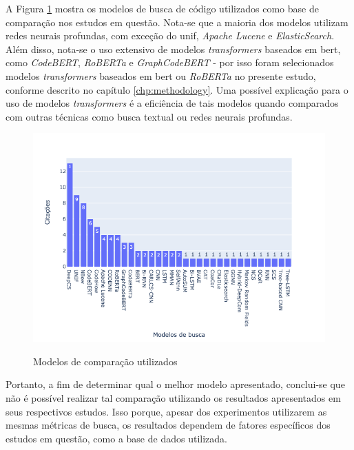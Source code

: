 A Figura \ref{fig:related-baselines} mostra os modelos de busca de código utilizados como base de comparação nos estudos em questão. Nota-se que a maioria dos modelos utilizam redes neurais profundas, com exceção do \gls{unif}, \textit{Apache Lucene} e \textit{ElasticSearch}. Além disso, nota-se o uso extensivo de modelos \textit{transformers} baseados em \gls{bert}, como \textit{CodeBERT}, \textit{RoBERTa} e \textit{GraphCodeBERT} - por isso foram selecionados modelos \textit{transformers} baseados em \gls{bert} ou \textit{RoBERTa} no presente estudo, conforme descrito no capítulo \ref{chp:methodology}. Uma possível explicação para o uso de modelos \textit{transformers} é a eficiência de tais modelos quando comparados com outras técnicas como busca textual ou redes neurais profundas.
\begin{figure}[H]
    \centering
        \caption{Modelos de comparação utilizados}
        \includegraphics[scale=0.7]{./imagens/trabalhos-relacionados/baselines.png}
        \label{fig:related-baselines}
\end{figure}

Portanto, a fim de determinar qual o melhor modelo apresentado, conclui-se que não é possível realizar tal comparação utilizando os resultados apresentados em seus respectivos estudos. Isso porque, apesar dos experimentos utilizarem as mesmas métricas de busca, os resultados dependem de fatores específicos dos estudos em questão, como a base de dados utilizada.

